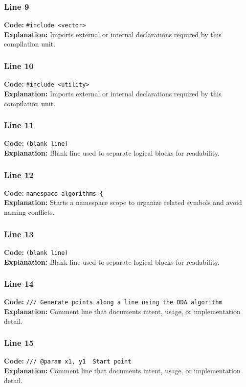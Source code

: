 \documentclass[11pt,a4paper]{article}
\begin{document}
\subsubsection*{Line 9}
\textbf{Code:} \verb|#include <vector>|\\
\textbf{Explanation:} Imports external or internal declarations required by this compilation unit.

\subsubsection*{Line 10}
\textbf{Code:} \verb|#include <utility>|\\
\textbf{Explanation:} Imports external or internal declarations required by this compilation unit.

\subsubsection*{Line 11}
\textbf{Code:} \texttt{(blank line)}\\
\textbf{Explanation:} Blank line used to separate logical blocks for readability.

\subsubsection*{Line 12}
\textbf{Code:} \verb|namespace algorithms {|\\
\textbf{Explanation:} Starts a namespace scope to organize related symbols and avoid naming conflicts.

\subsubsection*{Line 13}
\textbf{Code:} \texttt{(blank line)}\\
\textbf{Explanation:} Blank line used to separate logical blocks for readability.

\subsubsection*{Line 14}
\textbf{Code:} \verb|/// Generate points along a line using the DDA algorithm|\\
\textbf{Explanation:} Comment line that documents intent, usage, or implementation detail.

\subsubsection*{Line 15}
\textbf{Code:} \verb|/// @param x1, y1  Start point|\\
\textbf{Explanation:} Comment line that documents intent, usage, or implementation detail.
\end{document}
